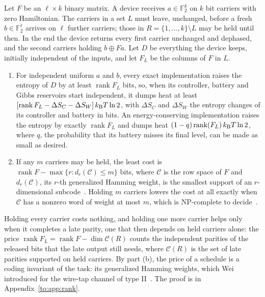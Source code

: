 \begin{proposition}\label{to:prop:rank}
Let $F$ be an $\ell\times k$ binary matrix. A device receives $a\in\mathbb F_2^k$ on $k$ bit carriers with zero Hamiltonian. The carriers in a set $L$ must leave, unchanged, before a fresh $b\in\mathbb F_2^\ell$ arrives on $\ell$ further carriers; those in $R=\{1,\dots,k\}\setminus L$ may be held until then. In the end the device returns every first carrier unchanged and dephased, and the second carriers holding $b\oplus Fa$. Let $D$ be everything the device keeps, initially independent of the inputs, and let $F_L$ be the columns of $F$ in $L$.
\begin{enumerate}[label=(\alph*)]
\item For independent uniform $a$ and $b$, every exact implementation raises the entropy of $D$ by at least $\operatorname{rank}F_L$ bits, so, when its controller, battery and Gibbs reservoirs start independent, it dumps heat at least $[\operatorname{rank}F_L-\Delta S_C-\Delta S_W]\,k_{\mathrm B} T\ln2$, with $\Delta S_C$ and $\Delta S_W$ the entropy changes of its controller and battery in bits. An energy-conserving implementation raises the entropy by exactly $\operatorname{rank}F_L$ and dumps heat $(1-q)\operatorname{rank}(F_L)\,k_{\mathrm B} T\ln2$, where $q$, the probability that its battery misses its final level, can be made as small as desired.
\item If any $m$ carriers may be held, the least cost is $\operatorname{rank}F-\max\{r:d_r(\mathcal C)\le m\}$ bits, where $\mathcal C$ is the row space of $F$ and $d_r(\mathcal C)$, its $r$-th generalized Hamming weight, is the smallest support of an $r$-dimensional subcode~\cite{Wei91}. Holding $m$ carriers lowers the cost at all exactly when $\mathcal C$ has a nonzero word of weight at most $m$, which is NP-complete to decide~\cite{Vardy97}.
\end{enumerate}
\end{proposition}

Holding every carrier costs nothing, and holding one more carrier helps only when it completes a late parity, one that then depends on held carriers alone: the price $\operatorname{rank}F_L=\operatorname{rank}F-\dim\mathcal C(R)$ counts the independent parities of the released bits that the late output still needs, where $\mathcal C(R)$ is the set of late parities supported on held carriers. By part (b), the price of a schedule is a coding invariant of the task: its generalized Hamming weights, which Wei introduced for the wire-tap channel of type II~\cite{Wei91}. The proof is in Appendix~\ref{to:app:rank}.

